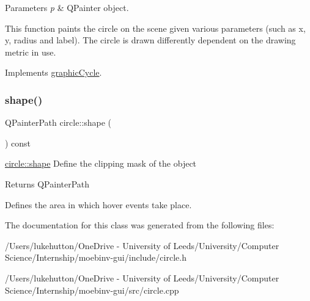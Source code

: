 \begin{DoxyParams}{Parameters}
{\em p} & Q\+Painter object.\\
\hline
\end{DoxyParams}
This function paints the circle on the scene given various parameters (such as x, y, radius and label). The circle is drawn differently dependent on the drawing metric in use. 

Implements \mbox{\hyperlink{classgraphic_cycle}{graphic\+Cycle}}.

\mbox{\label{classcircle_a198cbcea745bd311fe91c2a23def746c}} 
\subsubsection{\texorpdfstring{shape()}{shape()}}
{\footnotesize\ttfamily Q\+Painter\+Path circle\+::shape (\begin{DoxyParamCaption}{ }\end{DoxyParamCaption}) const}



\mbox{\hyperlink{classcircle_a198cbcea745bd311fe91c2a23def746c}{circle\+::shape}} Define the clipping mask of the object 

\begin{DoxyReturn}{Returns}
Q\+Painter\+Path
\end{DoxyReturn}
Defines the area in which hover events take place. 

The documentation for this class was generated from the following files\+:\begin{DoxyCompactItemize}
\item 
/\+Users/lukehutton/\+One\+Drive -\/ University of Leeds/\+University/\+Computer Science/\+Internship/moebinv-\/gui/include/circle.\+h\item 
/\+Users/lukehutton/\+One\+Drive -\/ University of Leeds/\+University/\+Computer Science/\+Internship/moebinv-\/gui/src/circle.\+cpp\end{DoxyCompactItemize}
